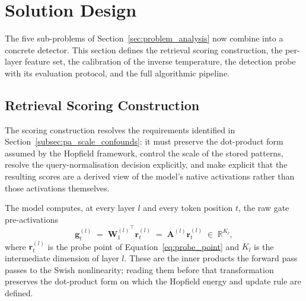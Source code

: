 \section{Solution Design}
\label{sec:solution_design}

The five sub-problems of Section~\ref{sec:problem_analysis} now combine into
a concrete detector. This section defines the retrieval scoring
construction, the per-layer feature set, the calibration of the inverse
temperature, the detection probe with its evaluation protocol, and the full
algorithmic pipeline.
\subsection{Retrieval Scoring Construction}
\label{subsec:retrieval_scoring}

The scoring construction resolves the requirements identified in
Section~\ref{subsec:pa_scale_confounds}: it must preserve the dot-product
form assumed by the Hopfield framework, control the scale of the stored
patterns, resolve the query-normalisation decision explicitly, and make
explicit that the resulting scores are a derived view of the model's native
activations rather than those activations themselves.

The model computes, at every layer $l$ and every token position $t$, the
raw gate pre-activations
\begin{equation}
    \mathbf{g}_t^{(l)}
    \;=\;
    {\mathbf{W}_1^{(l)}}^{\!\top}\mathbf{r}_t^{(l)}
    \;=\;
    \mathbf{A}^{(l)}\mathbf{r}_t^{(l)}
    \;\in\; \mathbb{R}^{K_l},
    \label{eq:gate_preactivations}
\end{equation}
where $\mathbf{r}_t^{(l)}$ is the probe point of
Equation~\eqref{eq:probe_point} and $K_l$ is the intermediate dimension of
layer $l$. These are the inner products the forward pass passes to the Swish
nonlinearity; reading them before that transformation preserves the
dot-product form on which the Hopfield energy and update rule are defined.

